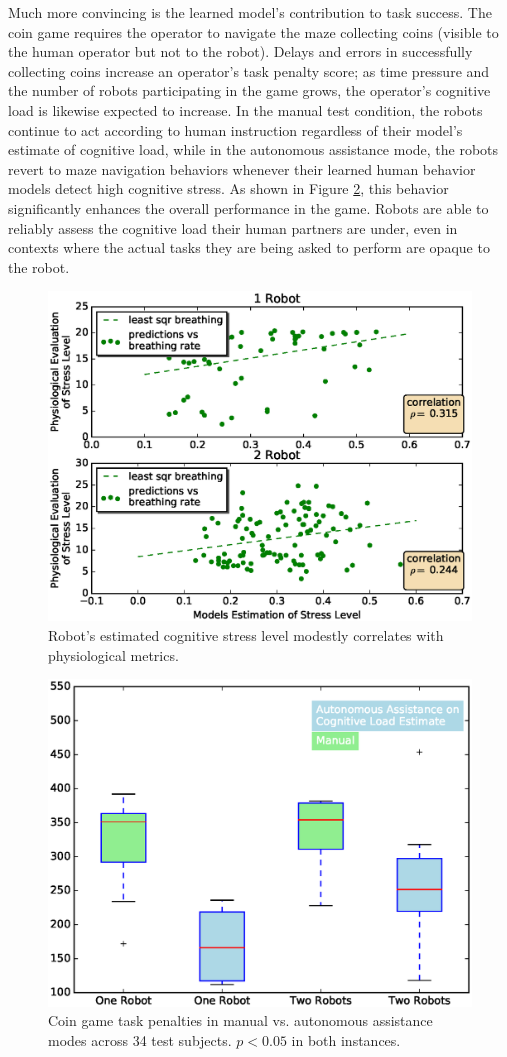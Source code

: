 \documentclass{sig-alternate-05-2015}
\begin{document}
Much more convincing is the learned model's contribution to task
success. The coin game requires the operator to navigate the maze
collecting coins (visible to the human operator but not to the
robot). Delays and errors in successfully collecting coins increase an
operator's task penalty score; as time pressure and the number of
robots participating in the game grows, the operator's cognitive load
is likewise expected to increase. In the manual test condition, the
robots continue to act according to human instruction regardless of
their model's estimate of cognitive load, while in the autonomous
assistance mode, the robots revert to maze navigation behaviors
whenever their learned human behavior models detect high cognitive
stress. As shown in Figure \ref{fig:BoxWiskersTimeComp}, this behavior
significantly enhances the overall performance in the game. Robots are
able to reliably assess the cognitive load their human partners are
under, even in contexts where the actual tasks they are being asked to
perform are opaque to the robot.

\begin{figure}  
\centering
\includegraphics[width=.5\textwidth]{prediction_vs_b_p_2.eps}
\caption{Robot's estimated cognitive stress level modestly correlates
  with physiological metrics.}
\label{fig:pred_phy}
\end{figure}

\begin{figure}
\centering
\includegraphics[width=.5\textwidth]{BoxWiskerTimesCompMaualVsAuto2.eps}
\caption{Coin game task penalties in manual vs. autonomous assistance
  modes across 34 test subjects. $p < 0.05$ in both instances.}
\label{fig:BoxWiskersTimeComp}
\end{figure}
\end{document}
